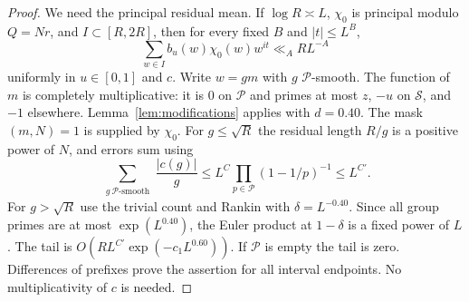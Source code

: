 \documentclass[11pt]{article}
\theoremstyle{definition}
\newcommand{\Pset}{\mathcal P}
\newcommand{\Sset}{\mathcal S}
\theoremstyle{remark}
\begin{document}
\begin{proof}
We need the principal residual mean. If $\log R\asymp L$, $\chi_0$
is principal modulo $Q=Nr$, and $I\subset[R,2R]$, then for every
fixed $B$ and $|t|\le L^B$,
\begin{equation}\label{eq:principal-residual}
\sum_{w\in I}b_u(w)\chi_0(w)w^{it}\ll_A RL^{-A}
\end{equation}
uniformly in $u\in[0,1]$ and $c$.
Write $w=gm$ with $g$ $\Pset$-smooth.
The function of $m$ is completely multiplicative: it is $0$ on
$\Pset$ and primes at most $z$, $-u$ on $\Sset$, and $-1$ elsewhere.
Lemma~\ref{lem:modifications} applies with $d=0.40$.
The mask $(m,N)=1$ is supplied by $\chi_0$.
For $g\le\sqrt R$ the residual length $R/g$ is a positive power of
$N$, and errors sum using
\begin{equation}\label{eq:smooth-harmonic}
\sum_{\substack{g\ {\Pset\text{-smooth}}}}\frac{|c(g)|}g
\le L^C\prod_{p\in\Pset}(1-1/p)^{-1}\le L^{C'}.
\end{equation}
For $g>\sqrt R$ use the trivial count and Rankin with
$\delta=L^{-0.40}$. Since all group primes are at most $\exp(L^{0.40})$,
the Euler product at $1-\delta$ is a fixed power of $L$.
The tail is $O(RL^{C'}\exp(-c_1L^{0.60}))$. If $\Pset$ is empty
the tail is zero. Differences of prefixes prove the assertion for
all interval endpoints. No multiplicativity of $c$ is needed.


\end{proof}
\end{document}
